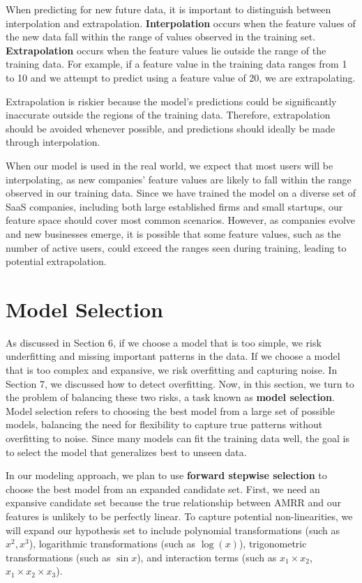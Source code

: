\documentclass[12pt]{article}
\begin{document}
When predicting for new future data, it is important to distinguish between interpolation and extrapolation. \textbf{Interpolation} occurs when the feature values of the new data fall within the range of values observed in the training set. \textbf{Extrapolation} occurs when the feature values lie outside the range of the training data. For example, if a feature value in the training data ranges from 1 to 10 and we attempt to predict using a feature value of 20, we are extrapolating.

Extrapolation is riskier because the model's predictions could be significantly inaccurate outside the regions of the training data. Therefore, extrapolation should be avoided whenever possible, and predictions should ideally be made through interpolation. 

When our model is used in the real world, we expect that most users will be interpolating, as new companies' feature values are likely to fall within the range observed in our training data. Since we have trained the model on a diverse set of SaaS companies, including both large established firms and small startups, our feature space should cover most common scenarios. However, as companies evolve and new businesses emerge, it is possible that some feature values, such as the number of active users, could exceed the ranges seen during training, leading to potential extrapolation.

\section{Model Selection}

As discussed in Section 6, if we choose a model that is too simple, we risk underfitting and missing important patterns in the data. If we choose a model that is too complex and expansive, we risk overfitting and capturing noise. In Section 7, we discussed how to detect overfitting. Now, in this section, we turn to the problem of balancing these two risks, a task known as \textbf{model selection}. Model selection refers to choosing the best model from a large set of possible models, balancing the need for flexibility to capture true patterns without overfitting to noise. Since many models can fit the training data well, the goal is to select the model that generalizes best to unseen data.

In our modeling approach, we plan to use \textbf{forward stepwise selection} to choose the best model from an expanded candidate set. First, we need an expansive candidate set because the true relationship between AMRR and our features is unlikely to be perfectly linear. To capture potential non-linearities, we will expand our hypothesis set to include polynomial transformations (such as \( x^2, x^3 \)), logarithmic transformations (such as \( \log(x) \)), trigonometric transformations (such as \( \sin{x} \)), and interaction terms (such as \( x_1 \times x_2 \), \( x_1 \times x_2 \times x_3 \)).
\end{document}
